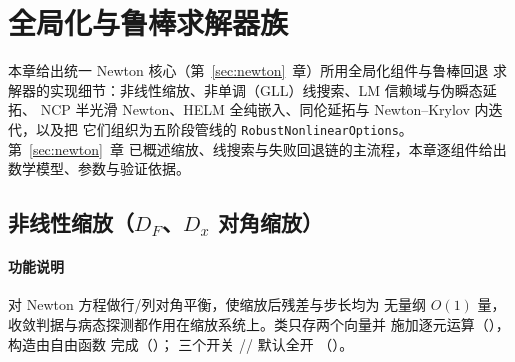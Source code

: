 \section{全局化与鲁棒求解器族}\label{sec:robust}

本章给出统一 Newton 核心（第~\ref{sec:newton}~章）所用全局化组件与鲁棒回退
求解器的实现细节：非线性缩放、非单调（GLL）线搜索、LM 信赖域与伪瞬态延拓、
NCP 半光滑 Newton、HELM 全纯嵌入、同伦延拓与 Newton--Krylov 内迭代，以及把
它们组织为五阶段管线的 \texttt{RobustNonlinearOptions}。第~\ref{sec:newton}~章
已概述缩放、线搜索与失败回退链的主流程，本章逐组件给出数学模型、参数与验证依据。

\subsection{非线性缩放（$D_F$、$D_x$ 对角缩放）}\label{sec:robust:scaling}

\paragraph{功能说明} 对 Newton 方程做行/列对角平衡，使缩放后残差与步长均为
无量纲 $O(1)$ 量，收敛判据与病态探测都作用在缩放系统上。类只存两个向量并
施加逐元运算（），构造由自由函数
 完成（）；
三个开关 //
 默认全开
（）。
